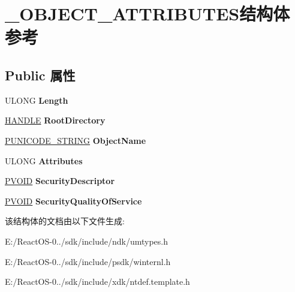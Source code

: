 \hypertarget{struct___o_b_j_e_c_t___a_t_t_r_i_b_u_t_e_s}{}\section{\+\_\+\+O\+B\+J\+E\+C\+T\+\_\+\+A\+T\+T\+R\+I\+B\+U\+T\+E\+S结构体 参考}
\label{struct___o_b_j_e_c_t___a_t_t_r_i_b_u_t_e_s}
\subsection*{Public 属性}
\begin{DoxyCompactItemize}
\item 
\mbox{\label{struct___o_b_j_e_c_t___a_t_t_r_i_b_u_t_e_s_aef711aa35ccec0e59ce380d836d436d1}} 
U\+L\+O\+NG {\bfseries Length}
\item 
\mbox{\label{struct___o_b_j_e_c_t___a_t_t_r_i_b_u_t_e_s_a81a3a1fa5c45cc06208aeb85e98af656}} 
\hyperlink{interfacevoid}{H\+A\+N\+D\+LE} {\bfseries Root\+Directory}
\item 
\mbox{\label{struct___o_b_j_e_c_t___a_t_t_r_i_b_u_t_e_s_adf5386ea5bbc4e46ee5df278d83fc3bd}} 
\hyperlink{struct___u_n_i_c_o_d_e___s_t_r_i_n_g}{P\+U\+N\+I\+C\+O\+D\+E\+\_\+\+S\+T\+R\+I\+NG} {\bfseries Object\+Name}
\item 
\mbox{\label{struct___o_b_j_e_c_t___a_t_t_r_i_b_u_t_e_s_a1d8b689e2a58e2636ad7ab487a4fb365}} 
U\+L\+O\+NG {\bfseries Attributes}
\item 
\mbox{\label{struct___o_b_j_e_c_t___a_t_t_r_i_b_u_t_e_s_adfce0bf43dbfa60476b4d786c7d78610}} 
\hyperlink{interfacevoid}{P\+V\+O\+ID} {\bfseries Security\+Descriptor}
\item 
\mbox{\label{struct___o_b_j_e_c_t___a_t_t_r_i_b_u_t_e_s_a9fe901e278495c5490b3288d26636482}} 
\hyperlink{interfacevoid}{P\+V\+O\+ID} {\bfseries Security\+Quality\+Of\+Service}
\end{DoxyCompactItemize}


该结构体的文档由以下文件生成\+:\begin{DoxyCompactItemize}
\item 
E\+:/\+React\+O\+S-\/0../sdk/include/ndk/umtypes.\+h\item 
E\+:/\+React\+O\+S-\/0../sdk/include/psdk/winternl.\+h\item 
E\+:/\+React\+O\+S-\/0../sdk/include/xdk/ntdef.\+template.\+h\end{DoxyCompactItemize}
